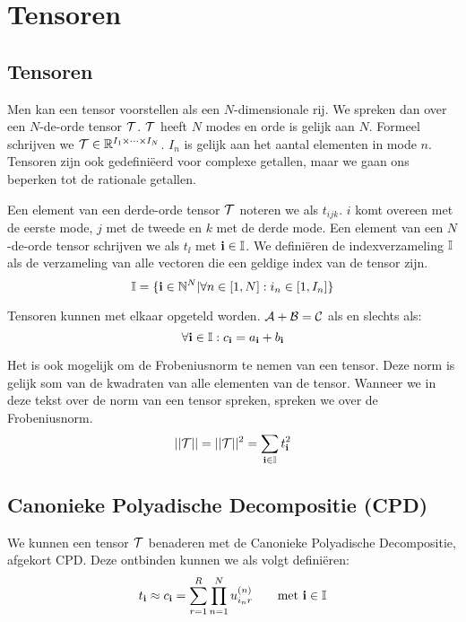 \chapter{Tensoren}
\label{h:tensoren}


\section{Tensoren}
Men kan een tensor voorstellen als een $N$-dimensionale rij. We spreken dan over een $N$-de-orde tensor $\mathcal{T}$. $\mathcal{T}$ heeft $N$ modes en orde is gelijk aan $N$. Formeel schrijven we $\mathcal{T} \in \mathbb{R}^{I_1 \times \dotsb \times I_N}$. $I_n$ is gelijk aan het aantal elementen in mode $n$. Tensoren zijn ook gedefini\"eerd voor complexe getallen, maar we gaan ons beperken tot de rationale getallen.


Een element van een derde-orde tensor $\mathcal{T}$ noteren we als $t_{ijk}$. $i$ komt overeen met de eerste mode, $j$ met de tweede en $k$ met de derde mode. Een element van een $N$-de-orde tensor schrijven we als $t_\ii$ met $\textbf{i} \in \mathbb{I}$. We defini\"eren de indexverzameling $\mathbb{I}$ als de verzameling van alle vectoren die een geldige index van de tensor zijn.
\[
    \mathbb{I} = \{\textbf{i} \in \mathbb{N}^N | \forall n \in [1, N]: i_n \in [1, I_n]\}
\]


Tensoren kunnen met elkaar opgeteld worden. $\mathcal{A} + \mathcal{B} = \mathcal{C}$ als en slechts als:
\[
	\forall \textbf{i} \in \mathbb{I}: c_{\textbf{i}} = a_{\textbf{i}} + b_{\textbf{i}}
\]

Het is ook mogelijk om de Frobeniusnorm te nemen van een tensor. Deze norm is gelijk som van de kwadraten van alle elementen van de tensor. Wanneer we in deze tekst over de norm van een tensor spreken, spreken we over de Frobeniusnorm.
\[
    ||\mathcal{T}|| = ||\mathcal{T}||^2 = \sum_{\textbf{i} \in \mathbb{I}} t_{\textbf{i}}^2
\]


\section{Canonieke Polyadische Decompositie (CPD)}
We kunnen een tensor $\mathcal{T}$ benaderen met de Canonieke Polyadische Decompositie, afgekort CPD. Deze ontbinden kunnen we als volgt defini\"eren:
\[
    t_{\textbf{i}} \approx c_{\textbf{i}} = \sum_{r=1}^{R} \prod_{n=1}^{N} u^{(n)}_{i_{n}r} \qquad \text{met $\textbf{i} \in \mathbb{I}$}
\]
